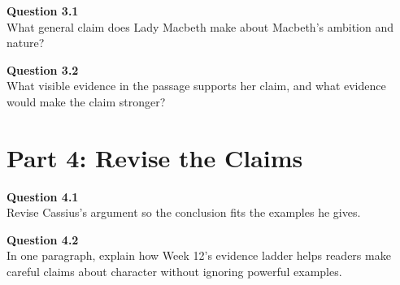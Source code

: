 \documentclass[12pt]{article}
\begin{document}
\textbf{Question 3.1}\\[-0.15em]
What general claim does Lady Macbeth make about Macbeth's ambition and nature?


\textbf{Question 3.2}\\[-0.15em]
What visible evidence in the passage supports her claim, and what evidence would make the claim stronger?


\newpage

\section*{Part 4: Revise the Claims}

\textbf{Question 4.1}\\[-0.15em]
Revise Cassius's argument so the conclusion fits the examples he gives.


\textbf{Question 4.2}\\[-0.15em]
In one paragraph, explain how Week 12's evidence ladder helps readers make careful claims about character without ignoring powerful examples.

\end{document}

